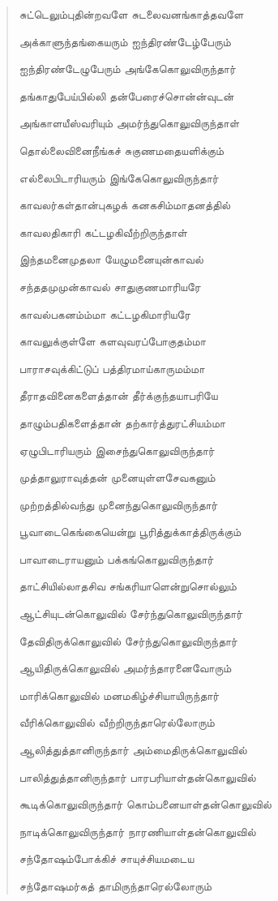 \documentclass{article}
\begin{document}
\begin{quotation}
{சுட்டெலும்புதின்றவளே சுடலைவனங்காத்தவளே

அக்காளுந்தங்கையரும் ஐந்திரண்டேழ்பேரும்

ஐந்திரண்டேழுபேரும் அங்கேகொலுவிருந்தார்

தங்காதுபேய்பில்லி தன்பேரைச்சொன்ன்வுடன்

அங்காளயீஸ்வரியும் அமர்ந்துகொலுவிருந்தாள்

தொல்லைவினைநீங்கச் சுகுணமதையளிக்கும்

எல்லைபிடாரியரும் இங்கேகொலுவிருந்தார்

காவலர்கள்தான்புகழக் கனகசிம்மாதனத்தில்

காவலதிகாரி கட்டழகிவீற்றிருந்தாள்

இந்தமனைமுதலா யேழுமனையுன்காவல்

சந்ததமுமுன்காவல் சாதுகுணமாரியரே

காவல்பகனம்ம்மா கட்டழகிமாரியரே

காவலுக்குள்ளே களவுவரப்போகுதம்மா

பாராசவுக்கிட்டுப் பத்திரமாய்காருமம்மா

தீராதவினைகளைத்தான் தீர்க்குந்தயாபரியே

தாழும்பதிகளைத்தான் தற்கார்த்துரட்சியம்மா

ஏழுபிடாரியரும் இசைந்துகொலுவிருந்தார்

முத்தாலுராவுத்தன் முனையுள்ளசேவகனும்

முற்றத்தில்வந்து முனைந்துகொலுவிருந்தார்

பூவாடைகெங்கையென்று பூரித்துக்காத்திருக்கும்

பாவாடைராயனும் பக்கங்கொலுவிருந்தார்

தாட்சியில்லாதசிவ சங்கரியாளென்றுசொல்லும்

ஆட்சியுடன்கொலுவில் சேர்ந்துகொலுவிருந்தார்

தேவிதிருக்கொலுவில் சேர்ந்துகொலுவிருந்தார்

ஆயிதிருக்கொலுவில் அமர்ந்தாரனைவோரும்

மாரிக்கொலுவில் மனமகிழ்ச்சியாயிருந்தார்

வீரிக்கொலுவில் வீற்றிருந்தாரெல்லோரும்

ஆலித்துத்தானிருந்தார் அம்மைதிருக்கொலுவில்

பாலித்துத்தானிருந்தார் பாரபரியாள்தன்கொலுவில்

கூடிக்கொலுவிருந்தார் கொம்பனையாள்தன்கொலுவில்

நாடிக்கொலுவிருந்தார் நாரணியாள்தன்கொலுவில்

சந்தோஷம்போக்கிச் சாயுச்சியமடைய

சந்தோஷமர்கத் தாமிருந்தாரெல்லோரும்

}
\end{quotation}
\end{document}
